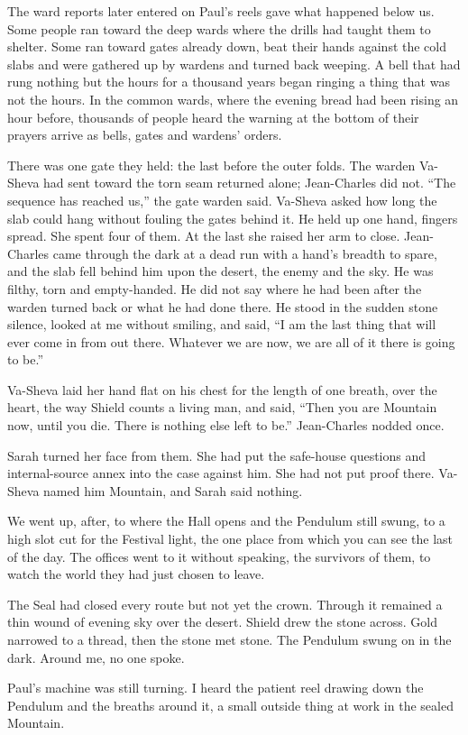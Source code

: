 The ward reports later entered on Paul's reels gave what happened below us. Some people ran toward the deep wards where the drills had taught them to shelter. Some ran toward gates already down, beat their hands against the cold slabs and were gathered up by wardens and turned back weeping. A bell that had rung nothing but the hours for a thousand years began ringing a thing that was not the hours. In the common wards, where the evening bread had been rising an hour before, thousands of people heard the warning at the bottom of their prayers arrive as bells, gates and wardens' orders.\par

There was one gate they held: the last before the outer folds. The warden Va-Sheva had sent toward the torn seam returned alone; Jean-Charles did not. ``The sequence has reached us,'' the gate warden said. Va-Sheva asked how long the slab could hang without fouling the gates behind it. He held up one hand, fingers spread. She spent four of them. At the last she raised her arm to close. Jean-Charles came through the dark at a dead run with a hand's breadth to spare, and the slab fell behind him upon the desert, the enemy and the sky. He was filthy, torn and empty-handed. He did not say where he had been after the warden turned back or what he had done there. He stood in the sudden stone silence, looked at me without smiling, and said, ``I am the last thing that will ever come in from out there. Whatever we are now, we are all of it there is going to be.''\par

Va-Sheva laid her hand flat on his chest for the length of one breath, over the heart, the way Shield counts a living man, and said, ``Then you are Mountain now, until you die. There is nothing else left to be.'' Jean-Charles nodded once. \par

Sarah turned her face from them. She had put the safe-house questions and internal-source annex into the case against him. She had not put proof there. Va-Sheva named him Mountain, and Sarah said nothing.\par

\ornament

We went up, after, to where the Hall opens and the Pendulum still swung, to a high slot cut for the Festival light, the one place from which you can see the last of the day. The offices went to it without speaking, the survivors of them, to watch the world they had just chosen to leave.\par

The Seal had closed every route but not yet the crown. Through it remained a thin wound of evening sky over the desert. Shield drew the stone across. Gold narrowed to a thread, then the stone met stone. The Pendulum swung on in the dark. Around me, no one spoke.\par

Paul's machine was still turning. I heard the patient reel drawing down the Pendulum and the breaths around it, a small outside thing at work in the sealed Mountain.\par
